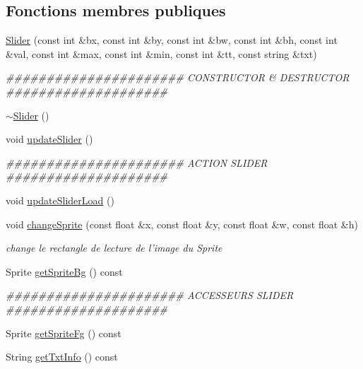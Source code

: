 \subsection*{Fonctions membres publiques}
\begin{DoxyCompactItemize}
\item 
\hyperlink{classSlider_a3e15c731f3ae0cd0d45e517c453e49c2}{Slider} (const int \&bx, const int \&by, const int \&bw, const int \&bh, const int \&val, const int \&max, const int \&min, const int \&tt, const string \&txt)
\begin{DoxyCompactList}\small\item\em \#\#\#\#\#\#\#\#\#\#\#\#\#\#\#\#\#\#\#\#\#\# CONSTRUCTOR \& DESTRUCTOR \#\#\#\#\#\#\#\#\#\#\#\#\#\#\#\#\#\#\#\# \end{DoxyCompactList}\item 
\hyperlink{classSlider_aaca12abbe07a83f925d66339aa332028}{$\sim$Slider} ()
\item 
void \hyperlink{classSlider_acc9887e97479844580feeda8e5985359}{updateSlider} ()
\begin{DoxyCompactList}\small\item\em \#\#\#\#\#\#\#\#\#\#\#\#\#\#\#\#\#\#\#\#\#\# ACTION SLIDER \#\#\#\#\#\#\#\#\#\#\#\#\#\#\#\#\#\#\#\# \end{DoxyCompactList}\item 
void \hyperlink{classSlider_a94eb9e662eb0a426f6960b035d61406d}{updateSliderLoad} ()
\item 
void \hyperlink{classSlider_a658bab75721ccf32dac0b0580ebadfb3}{changeSprite} (const float \&x, const float \&y, const float \&w, const float \&h)
\begin{DoxyCompactList}\small\item\em change le rectangle de lecture de l'image du Sprite \end{DoxyCompactList}\item 
Sprite \hyperlink{classSlider_a65dc450cc8d174073ef90756b73d3340}{getSpriteBg} () const 
\begin{DoxyCompactList}\small\item\em \#\#\#\#\#\#\#\#\#\#\#\#\#\#\#\#\#\#\#\#\#\# ACCESSEURS SLIDER \#\#\#\#\#\#\#\#\#\#\#\#\#\#\#\#\#\#\#\# \end{DoxyCompactList}\item 
Sprite \hyperlink{classSlider_a769825ba2b0e333cabe622f85c6c556e}{getSpriteFg} () const 
\item 
String \hyperlink{classSlider_a85154ebcca5ad1727777faba5c3aa0dc}{getTxtInfo} () const 
\item 

\end{DoxyCompactItemize}
